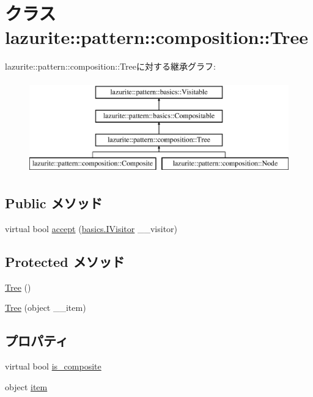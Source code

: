 \hypertarget{classlazurite_1_1pattern_1_1composition_1_1_tree}{
\section{クラス lazurite::pattern::composition::Tree}
\label{classlazurite_1_1pattern_1_1composition_1_1_tree}
}
lazurite::pattern::composition::Treeに対する継承グラフ:\begin{figure}[H]
\begin{center}
\leavevmode
\includegraphics[height=4cm]{classlazurite_1_1pattern_1_1composition_1_1_tree}
\end{center}
\end{figure}
\subsection*{Public メソッド}
\begin{DoxyCompactItemize}
\item 
virtual bool \hyperlink{classlazurite_1_1pattern_1_1composition_1_1_tree_ad31584f25c465eea5b1c294e50f805a7}{accept} (\hyperlink{interfacelazurite_1_1pattern_1_1basics_1_1_i_visitor}{basics.IVisitor} \_\-\_\-visitor)
\end{DoxyCompactItemize}
\subsection*{Protected メソッド}
\begin{DoxyCompactItemize}
\item 
\hyperlink{classlazurite_1_1pattern_1_1composition_1_1_tree_a99080f57f88e1268cee7413a699aa29b}{Tree} ()
\item 
\hyperlink{classlazurite_1_1pattern_1_1composition_1_1_tree_a8a891cc4b517eda9efd02670df3c9343}{Tree} (object \_\-\_\-item)
\end{DoxyCompactItemize}
\subsection*{プロパティ}
\begin{DoxyCompactItemize}
\item 
virtual bool \hyperlink{classlazurite_1_1pattern_1_1composition_1_1_tree_a292230ac66f50163b23b306d698ad511}{is\_\-composite}
\item 
object \hyperlink{classlazurite_1_1pattern_1_1composition_1_1_tree_a2c78ae8ec2f8cb02c6971548c3c1be16}{item}
\end{DoxyCompactItemize}


